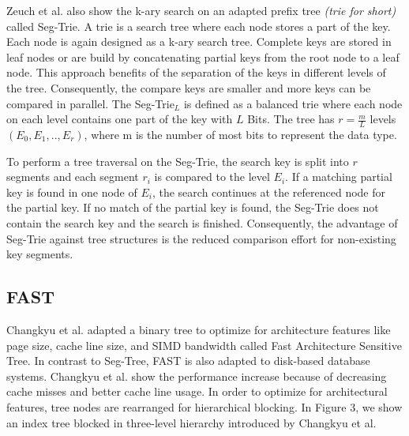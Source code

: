 \documentclass[conference]{IEEEtran}
\begin{document}
Zeuch et al. also show the k-ary search on an adapted prefix tree \emph{(trie for short)} called Seg-Trie. A trie is a search tree where each node stores a part of the key. Each node is again designed as a k-ary search tree. Complete keys are stored in leaf nodes or are build by concatenating partial keys from the root node to a leaf node. This approach benefits of the separation of the keys in different levels of the tree. Consequently, the compare keys are smaller and more keys can be compared in parallel. The Seg-Trie$_L$ is defined as a balanced trie where each node on each level contains one part of the key with $L$ Bits. The tree has $r = \frac{m}{L}$ levels $(E_0, E_1, .., E_r)$, where m is the number of most bits to represent the data type.

To perform a tree traversal on the Seg-Trie, the search key is split into $r$ segments and each segment $r_i$ is compared to the level $E_i$. If a matching partial key is found in one node of $E_i$, the search continues at the referenced node for the partial key. If no match of the partial key is found, the Seg-Trie does not contain the search key and the search is finished. Consequently, the advantage of Seg-Trie against tree structures is the reduced comparison effort for non-existing key segments. 


\subsection{FAST}\label{SCM}
Changkyu et al. adapted a binary tree to optimize for architecture features like page size, cache line size, and SIMD bandwidth called Fast Architecture Sensitive Tree. In contrast to Seg-Tree, FAST is also adapted to disk-based database systems. Changkyu et al. show the performance increase because of decreasing cache misses and better cache line usage. In order to optimize for architectural features, tree nodes are rearranged for hierarchical blocking. In Figure 3, we show an index tree blocked in three-level hierarchy introduced by Changkyu et al. 
\end{document}
